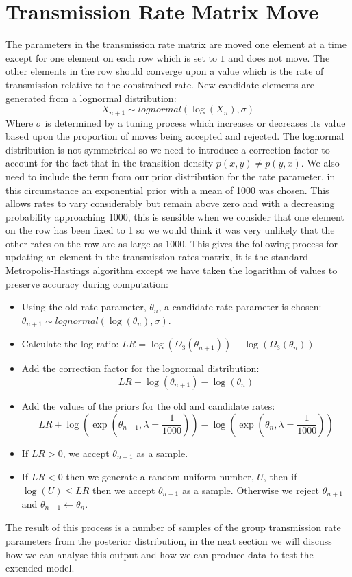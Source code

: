 \documentclass[11pt,a4paper]{report}
\begin{document}
\section{Transmission Rate Matrix Move}
The parameters in the transmission rate matrix are moved one element at a time except for one element on each row which is set to $1$ and does not move. The other elements in the row should converge upon a value which is the rate of transmission relative to the constrained rate. New candidate elements are generated from a lognormal distribution:
\[ X_{n+1} \sim lognormal(\log(X_n),\sigma) \]
Where $\sigma$ is determined by a tuning process which increases or decreases its value based upon the proportion of moves being accepted and rejected. The lognormal distribution is not symmetrical so we need to introduce a correction factor to account for the fact that in the transition density $p(x,y) \neq p(y,x)$. We also need to include the term from our prior distribution for the rate parameter, in this circumstance an exponential prior with a mean of 1000 was chosen. This allows rates to vary considerably but remain above zero and with a decreasing probability approaching 1000, this is sensible when we consider that one element on the row has been fixed to 1 so we would think it was very unlikely that the other rates on the row are as large as 1000. This gives the following process for updating an element in the transmission rates matrix, it is the standard Metropolis-Hastings algorithm except we have taken the logarithm of values to preserve accuracy during computation:
\begin{itemize}
\item Using the old rate parameter, $\theta_n$, a candidate rate parameter is chosen: $\theta_{n+1} \sim lognormal(\log(\theta_n),\sigma)$.
\item Calculate the log ratio: $ LR = \log(\Omega_3(\theta_{n+1})) - \log(\Omega_3(\theta_{n}))$
\item Add the correction factor for the lognormal distribution: 
\[ LR + \log(\theta_{n+1}) - \log(\theta_n) \]
\item Add the values of the priors for the old and candidate rates: 
\[ LR + \log(\exp(\theta_{n+1},\lambda=\frac{1}{1000})) - \log(\exp(\theta_{n},\lambda=\frac{1}{1000}))\]
\item If $LR > 0$, we accept $\theta_{n+1}$ as a sample.
\item If $LR < 0$ then we generate a random uniform number, $U$, then if $\log(U) \leq LR$ then we accept $\theta_{n+1}$ as a sample. Otherwise we reject $\theta_{n+1}$ and $\theta_{n+1} \leftarrow \theta_n$.
\end{itemize}
The result of this process is a number of samples of the group transmission rate parameters from the posterior distribution, in the next section we will discuss how we can analyse this output and how we can produce data to test the extended model.
\end{document}
